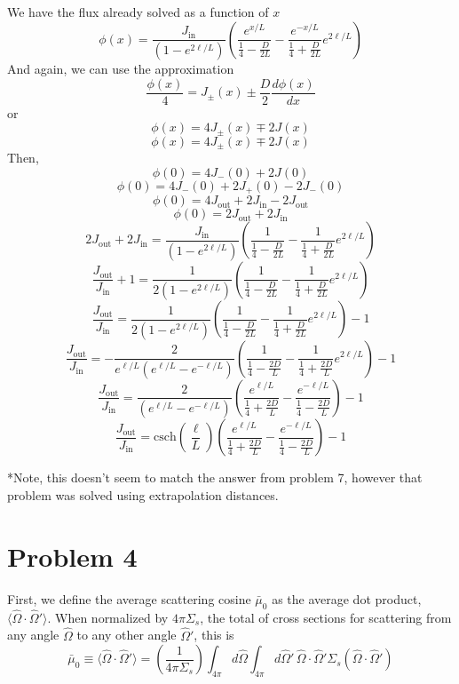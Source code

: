 \documentclass{article}
\newcommand{\Oh}{\hat{\Omega}}
\begin{document}
We have the flux already solved as a function of $x$
$$ \phi(x) = \frac{J_{\text{in}}}{\left(1 -e^{2\ell/L}\right)}\left(\frac{e^{x/L}}{\frac{1}{4} - \frac{D}{2L}} -\frac{e^{-x/L}}{\frac{1}{4} + \frac{D}{2L}}e^{2\ell/L}\right) $$
And again, we can use the approximation
$$ \frac{\phi(x)}{4} = J_{\pm}(x) \pm \frac{D}{2}\frac{d\phi(x)}{dx} $$
or
$$ \phi(x) = 4J_{\pm}(x) \mp 2J(x) $$
$$ \phi(x) = 4J_{\pm}(x) \mp 2J(x) $$
Then,
$$ \phi(0) = 4J_-(0) + 2J(0) $$
$$ \phi(0) = 4J_-(0) + 2J_+(0) - 2J_-(0) $$
$$ \phi(0) = 4J_{\text{out}} + 2J_{\text{in}} - 2J_{\text{out}} $$
$$ \phi(0) = 2J_{\text{out}} + 2J_{\text{in}} $$
$$ 2J_{\text{out}} + 2J_{\text{in}} = \frac{J_{\text{in}}}{\left(1 -e^{2\ell/L}\right)}\left(\frac{1}{\frac{1}{4} - \frac{D}{2L}} -\frac{1}{\frac{1}{4} + \frac{D}{2L}}e^{2\ell/L}\right)$$
$$ \frac{J_{\text{out}}}{J_{\text{in}}} + 1 = \frac{1}{2\left(1 -e^{2\ell/L}\right)}\left(\frac{1}{\frac{1}{4} - \frac{D}{2L}} -\frac{1}{\frac{1}{4} + \frac{D}{2L}}e^{2\ell/L}\right)$$
$$ \frac{J_{\text{out}}}{J_{\text{in}}} = \frac{1}{2\left(1 -e^{2\ell/L}\right)}\left(\frac{1}{\frac{1}{4} - \frac{D}{2L}} -\frac{1}{\frac{1}{4} + \frac{D}{2L}}e^{2\ell/L}\right) - 1$$
$$ \frac{J_{\text{out}}}{J_{\text{in}}} = -\frac{2}{e^{\ell/L}\left(e^{\ell/L} -e^{-\ell/L}\right)}\left(\frac{1}{\frac{1}{4} - \frac{2D}{L}} -\frac{1}{\frac{1}{4} + \frac{2D}{L}}e^{2\ell/L}\right) - 1$$
$$ \frac{J_{\text{out}}}{J_{\text{in}}} = \frac{2}{\left(e^{\ell/L} -e^{-\ell/L}\right)}\left(\frac{e^{\ell/L}}{\frac{1}{4} + \frac{2D}{L}} - \frac{e^{-\ell/L}}{\frac{1}{4} - \frac{2D}{L}} \right) - 1$$
$$ \frac{J_{\text{out}}}{J_{\text{in}}} = \text{csch}\left(\frac{\ell}{L}\right)\left(\frac{e^{\ell/L}}{\frac{1}{4} + \frac{2D}{L}} - \frac{e^{-\ell/L}}{\frac{1}{4} - \frac{2D}{L}} \right) - 1$$


*Note, this doesn't seem to match the answer from problem 7, however that problem was solved using extrapolation distances. 




\section*{Problem 4}

First, we define the average scattering cosine $\bar{\mu}_0$ as the average dot product, $\langle \Oh \cdot \Oh' \rangle$. When normalized by $4\pi\Sigma_s$, the total of cross sections for scattering from any angle $\Oh$ to any other angle $\Oh'$, this is
$$ \bar{\mu}_0 \equiv \langle \Oh \cdot \Oh' \rangle = \left(\frac{1}{4\pi\Sigma_s}\right)  \int_{4\pi} d\Oh \int_{4\pi} d\Oh' \, \Oh \cdot \Oh' \Sigma_s(\Oh \cdot \Oh') $$
\end{document}
